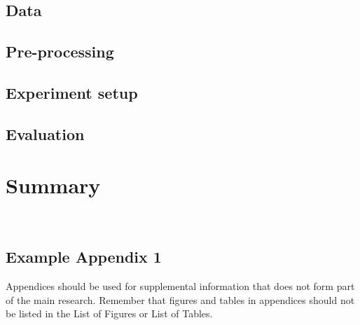 \documentclass{imc-inf}
\begin{document}
\section{Data}

\section{Pre-processing}

\section{Experiment setup}

\section{Evaluation}


\chapter{Summary}



%
%
%
%
%

\backmatter%
	
 \typeout{}
	
	

	‌
	

\begin{appendices} %
\chapter{Example Appendix 1}

Appendices should be used for supplemental information that does not form part of the main research. Remember that figures and tables in appendices should not be listed in the List of Figures or List of Tables. 

\end{appendices}
\end{document}
